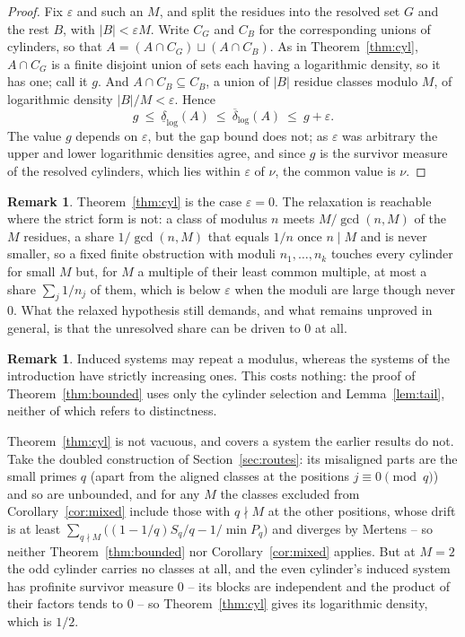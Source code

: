 \documentclass[11pt]{article}
\theoremstyle{plain}
\theoremstyle{definition}
\newtheorem{remark}[theorem]{Remark}
\begin{document}
\begin{proof}
Fix $\varepsilon$ and such an $M$, and split the residues into
the resolved set $G$ and the rest $B$, with $|B|<\varepsilon M$.
Write $C_G$ and $C_B$ for the corresponding unions of
cylinders, so that $A=(A\cap C_G)\sqcup(A\cap C_B)$.  As in
Theorem~\ref{thm:cyl}, $A\cap C_G$ is a finite disjoint union of
sets each having a logarithmic density, so it has one; call it
$g$.  And $A\cap C_B\subseteq C_B$, a union of $|B|$ residue
classes modulo $M$, of logarithmic density $|B|/M<\varepsilon$.
Hence
\[
  g\ \le\ \underline{\delta}_{\log}(A)
   \ \le\ \overline{\delta}_{\log}(A)\ \le\ g+\varepsilon .
\]
The value $g$ depends on $\varepsilon$, but the gap bound does
not; as $\varepsilon$ was arbitrary the upper and lower
logarithmic densities agree, and since $g$ is the survivor
measure of the resolved cylinders, which lies within
$\varepsilon$ of $\nu$, the common value is $\nu$.
\end{proof}

\begin{remark}
Theorem~\ref{thm:cyl} is the case $\varepsilon=0$.  The
relaxation is reachable where the strict form is not: a class
of modulus $n$ meets $M/\gcd(n,M)$ of the $M$ residues, a share
$1/\gcd(n,M)$ that equals $1/n$ once $n\mid M$ and is never
smaller, so a fixed finite obstruction with moduli
$n_1,\dots,n_k$ touches every cylinder for small $M$ but, for
$M$ a multiple of their least common multiple, at most a share
$\sum_j1/n_j$ of them, which is below $\varepsilon$ when the
moduli are large though never $0$.  What the relaxed hypothesis
still demands, and what remains unproved in general, is that
the unresolved share can be driven to $0$ at all.
\end{remark}

\begin{remark}
Induced systems may repeat a modulus, whereas the systems of the
introduction have strictly increasing ones.  This costs nothing:
the proof of Theorem~\ref{thm:bounded} uses only the cylinder
selection and Lemma~\ref{lem:tail}, neither of which refers to
distinctness.

Theorem~\ref{thm:cyl} is not vacuous, and covers a system the earlier
results do not.  Take the doubled construction of Section~\ref{sec:routes}: its
misaligned parts are the small primes $q$ (apart from the aligned
classes at the positions $j\equiv0\pmod q$) and so are unbounded,
and for any $M$ the classes excluded from
Corollary~\ref{cor:mixed} include those with $q\nmid M$ at the
other positions, whose drift is at least
$\sum_{q\nmid M}\bigl((1-1/q)S_q/q-1/\min P_q\bigr)$ and diverges by
Mertens -- so neither
Theorem~\ref{thm:bounded} nor Corollary~\ref{cor:mixed}
applies.  But at $M=2$ the odd cylinder carries no classes at
all, and the even cylinder's induced system has profinite
survivor measure $0$ -- its blocks are independent and the
product of their factors tends to $0$ -- so
Theorem~\ref{thm:cyl} gives its logarithmic density, which is
$1/2$.
\end{remark}
\end{document}
